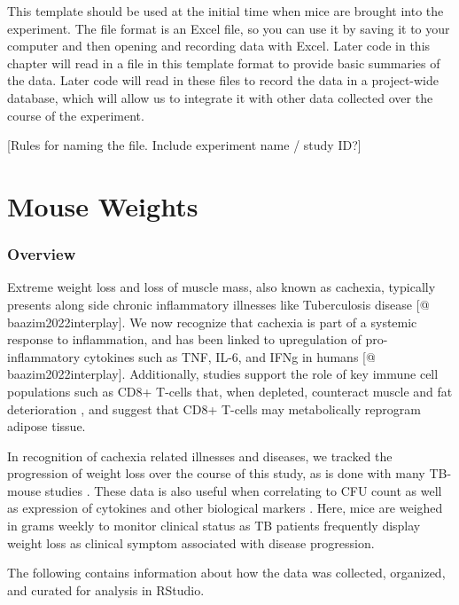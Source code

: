 \documentclass[
]{book}
\begin{document}
This template should be used at the
initial time when mice are brought into the experiment. The file format is an
Excel file, so you can use it by saving it to your computer and then opening and
recording data with Excel. Later code in this chapter will read in a file in
this template format to provide basic summaries of the data. Later code will
read in these files to record the data in a project-wide database, which will
allow us to integrate it with other data collected over the course of the
experiment.

{[}Rules for naming the file. Include experiment name / study ID?{]}

\hypertarget{mouse-weights}{%
\chapter{Mouse Weights}\label{mouse-weights}}

\hypertarget{overview-1}{%
\subsection{Overview}\label{overview-1}}

Extreme weight loss and loss of muscle mass, also known as cachexia, typically presents along side chronic inflammatory illnesses like Tuberculosis disease {[}@ baazim2022interplay{]}. We now recognize that cachexia is part of a systemic response to inflammation, and has been linked to upregulation of pro-inflammatory cytokines such as TNF, IL-6, and IFNg in humans {[}@ baazim2022interplay{]}. Additionally, studies support the role of key immune cell populations such as CD8+ T-cells that, when depleted, counteract muscle and fat deterioration \citep{baazim2019cd8}, and suggest that CD8+ T-cells may metabolically reprogram adipose tissue.

In recognition of cachexia related illnesses and diseases, we tracked the progression of weight loss over the course of this study, as is done with many TB-mouse studies \citep{smith2022host, segueni2016controlled}. These data is also useful when correlating to CFU count as well as expression of cytokines and other biological markers \citep{smith2022host}. Here, mice are weighed in grams weekly to monitor clinical status as TB patients frequently display weight loss as clinical symptom associated with disease progression.

The following contains information about how the data was collected, organized, and curated for analysis in RStudio.
\end{document}
